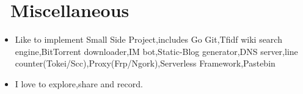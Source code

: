 \documentclass{resume}
\newcommand{\en}[1]{#1}
\newcommand{\zh}[1]{}
\begin{document}
\section{\faInfo\ \en{Miscellaneous}\zh{杂项}}
\begin{itemize}[parsep=0.6ex]
      \item \en{Like to implement Small Side Project,includes Go Git,Tfidf wiki search engine,BitTorrent downloader,IM bot,Static-Blog generator,DNS server,line counter(Tokei/Scc),Proxy(Frp/Ngork),Serverless Framework,Pastebin}
            \zh{喜欢实现 Small Side Project,包括 Go Git、Tfidf wiki 搜索引擎、BitTorrent downloader、IM bot、Static-Blog generator、line counter(Tokei/Scc)、Proxy(Frp/Ngork)、Serverless Framework、Pastebin 等等}
      \item \en{I love to explore,share and record.}
            \zh{喜欢折腾和探索,热爱分享和记录}
\end{itemize}
\end{document}
